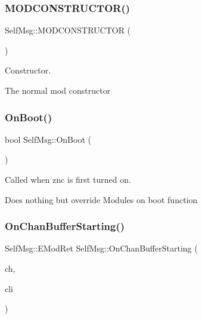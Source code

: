 \subsubsection{\texorpdfstring{M\+O\+D\+C\+O\+N\+S\+T\+R\+U\+C\+T\+O\+R()}{MODCONSTRUCTOR()}}
{\footnotesize\ttfamily Self\+Msg\+::\+M\+O\+D\+C\+O\+N\+S\+T\+R\+U\+C\+T\+OR (\begin{DoxyParamCaption}\item[{\hyperlink{class_self_msg}{Self\+Msg}}]{ }\end{DoxyParamCaption})\hspace{0.3cm}{\ttfamily [inline]}}



Constructor. 

The normal mod constructor \mbox{\label{class_self_msg_a59bd01047737a3b30ae430fc3612653d}} 
\subsubsection{\texorpdfstring{On\+Boot()}{OnBoot()}}
{\footnotesize\ttfamily bool Self\+Msg\+::\+On\+Boot (\begin{DoxyParamCaption}{ }\end{DoxyParamCaption})\hspace{0.3cm}{\ttfamily [override]}}



Called when znc is first turned on. 

Does nothing but override Module\textquotesingle{}s on boot function \mbox{\label{class_self_msg_a8c7c5d393c196048cd51b63bc8ba59b1}} 
\subsubsection{\texorpdfstring{On\+Chan\+Buffer\+Starting()}{OnChanBufferStarting()}}
{\footnotesize\ttfamily Self\+Msg\+::\+E\+Mod\+Ret Self\+Msg\+::\+On\+Chan\+Buffer\+Starting (\begin{DoxyParamCaption}\item[{C\+Chan \&}]{ch,  }\item[{C\+Client \&}]{cli }\end{DoxyParamCaption})\hspace{0.3cm}{\ttfamily [override]}}



